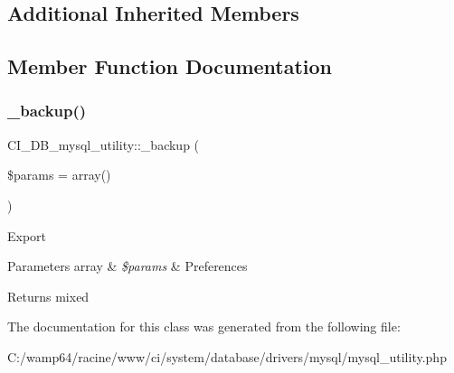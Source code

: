 \subsection*{Additional Inherited Members}


\subsection{Member Function Documentation}
\mbox{\label{class_c_i___d_b__mysql__utility_a31fc59000279e7e4af01bd1ea4de9c5c}} 
\subsubsection{\texorpdfstring{\+\_\+backup()}{\_backup()}}
{\footnotesize\ttfamily C\+I\+\_\+\+D\+B\+\_\+mysql\+\_\+utility\+::\+\_\+backup (\begin{DoxyParamCaption}\item[{}]{\$params = {\ttfamily array()} }\end{DoxyParamCaption})\hspace{0.3cm}{\ttfamily [protected]}}

Export


\begin{DoxyParams}[1]{Parameters}
array & {\em \$params} & Preferences \\
\hline
\end{DoxyParams}
\begin{DoxyReturn}{Returns}
mixed 
\end{DoxyReturn}


The documentation for this class was generated from the following file\+:\begin{DoxyCompactItemize}
\item 
C\+:/wamp64/racine/www/ci/system/database/drivers/mysql/mysql\+\_\+utility.\+php\end{DoxyCompactItemize}
